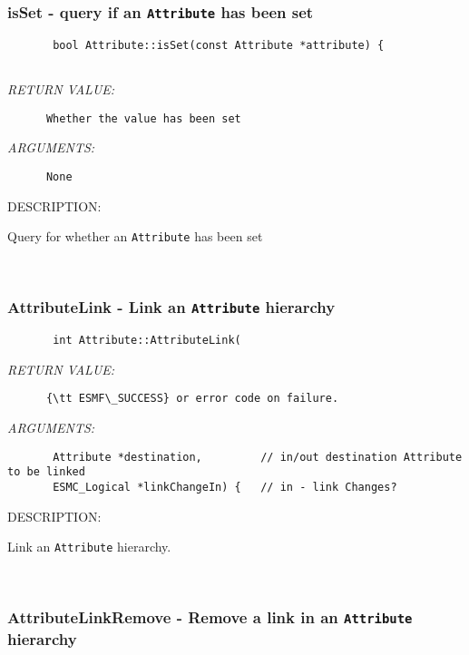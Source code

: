 \subsubsection [isSet] {isSet - query if an {\tt Attribute} has been set}


  
\begin{verbatim}       bool Attribute::isSet(const Attribute *attribute) {
 
   \end{verbatim}{\em RETURN VALUE:}
\begin{verbatim}      Whether the value has been set
   \end{verbatim}{\em ARGUMENTS:}
\begin{verbatim}   
      None\end{verbatim}
{\sf DESCRIPTION:\\ }


       Query for whether an {\tt Attribute} has been set
   
 
\mbox{}\hrulefill\
 
\subsubsection [AttributeLink] {AttributeLink - Link an {\tt Attribute} hierarchy}


  
\begin{verbatim}       int Attribute::AttributeLink(\end{verbatim}{\em RETURN VALUE:}
\begin{verbatim}      {\tt ESMF\_SUCCESS} or error code on failure.
   \end{verbatim}{\em ARGUMENTS:}
\begin{verbatim}       Attribute *destination,         // in/out destination Attribute to be linked
       ESMC_Logical *linkChangeIn) {   // in - link Changes?\end{verbatim}
{\sf DESCRIPTION:\\ }


       Link an {\tt Attribute} hierarchy.
   
 
\mbox{}\hrulefill\
 
\subsubsection [AttributeLinkRemove] {AttributeLinkRemove - Remove a link in an {\tt Attribute} hierarchy}


